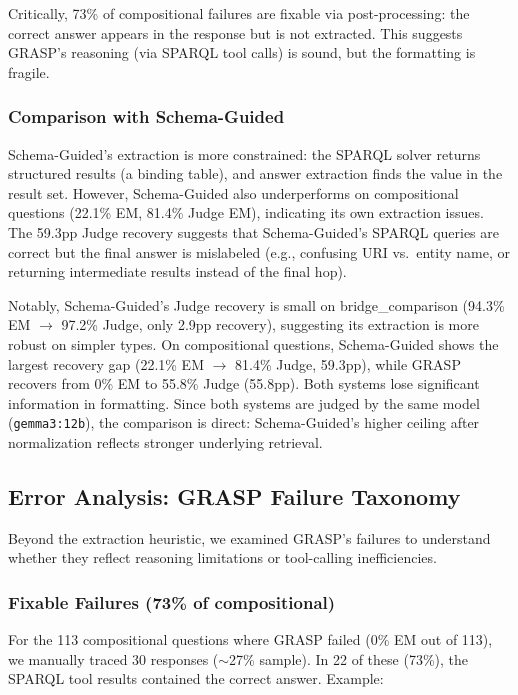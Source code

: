 Critically, 73\% of compositional failures are fixable via post-processing: the correct answer appears in the response but is not extracted. This suggests GRASP's reasoning (via SPARQL tool calls) is sound, but the formatting is fragile.

\subsubsection{Comparison with Schema-Guided}

Schema-Guided's extraction is more constrained: the SPARQL solver returns structured results (a binding table), and answer extraction finds the value in the result set. However, Schema-Guided also underperforms on compositional questions (22.1\% EM, 81.4\% Judge EM), indicating its own extraction issues. The 59.3pp Judge recovery suggests that Schema-Guided's SPARQL queries are correct but the final answer is mislabeled (e.g., confusing URI vs.\ entity name, or returning intermediate results instead of the final hop).

Notably, Schema-Guided's Judge recovery is small on bridge\_comparison (94.3\% EM $\to$ 97.2\% Judge, only 2.9pp recovery), suggesting its extraction is more robust on simpler types. On compositional questions, Schema-Guided shows the largest recovery gap (22.1\% EM $\to$ 81.4\% Judge, 59.3pp), while GRASP recovers from 0\% EM to 55.8\% Judge (55.8pp). Both systems lose significant information in formatting. Since both systems are judged by the same model (\texttt{gemma3:12b}), the comparison is direct: Schema-Guided's higher ceiling after normalization reflects stronger underlying retrieval.

\subsection{Error Analysis: GRASP Failure Taxonomy}
\label{sec:error-analysis}

Beyond the extraction heuristic, we examined GRASP's failures to understand whether they reflect reasoning limitations or tool-calling inefficiencies.

\subsubsection{Fixable Failures (73\% of compositional)}

For the 113 compositional questions where GRASP failed (0\% EM out of 113), we manually traced 30 responses ($\sim$27\% sample). In 22 of these (73\%), the SPARQL tool results contained the correct answer. Example:

